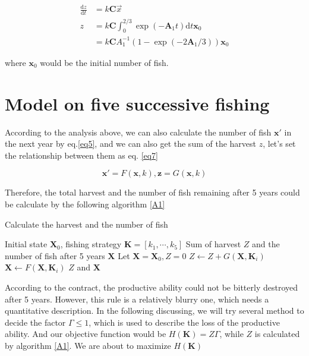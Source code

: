 \documentclass{IEEEtran}
\begin{document}
\begin{align}
    \label{eq6}
    \frac {\mathrm dz}{\mathrm dt} &= k\mathbf C \vec x\\
    z &= k\mathbf C\int_0^{2/3}\exp(-\mathbf A_1t)\mathrm dt\bm x_0 \\ 
    &= k\mathbf C  A_1^{-1} (1-\exp(-2\mathbf A_1/3))\bm x_0
\end{align}

where $\bm x_0$ would be the initial number of fish.


%
%
\section{Model on five successive fishing}\label{model2}

According to the analysis above, we can also calculate the number of fish $\bm x'$ in the next year by eq.\ref{eq5}, and we can also get the sum of the harvest $z$, let's set the relationship between them as eq. \ref{eq7}

\begin{equation}
    \label{eq7}
    \bm x' = F(\bm x, k), \bm z = G(\bm x,k)
\end{equation}

Therefore, the total harvest and the number of fish remaining after 5 years could be calculate by the following algorithm \ref{A1}

\begin{algorithm}[h]
    \caption{Calculate the harvest and the number of fish}\label{A1}
    \begin{algorithmic}
        \Require Initial state $\bm X_0$, fishing strategy $\bm K = [k_1,\cdots,k_5]$ 
        \Ensure Sum of harvest $Z$ and the number of fish after 5 years $\bm X$
        \State Let $\bm X = \bm X_0, Z = 0$
        \State $Z \leftarrow Z + G(\bm X,\bm K_i)$
        \State $\bm X \leftarrow F(\bm X, \bm K_i)$
        \EndFor
    \State \Return $Z$ and $\bm X$
    \end{algorithmic}
\end{algorithm}

According to the contract, the productive ability could not be bitterly destroyed after 5 years. However, this rule is a relatively blurry one, which needs a quantitative description. In the following discussing, we will try several method to decide the factor $\Gamma \le 1$, which is used to describe the loss of the productive ability. And our objective function would be $H(\bm K) = Z\Gamma$, while $Z$ is calculated by algorithm \ref{A1}. We are about to maximize $H(\bm K)$
\end{document}
